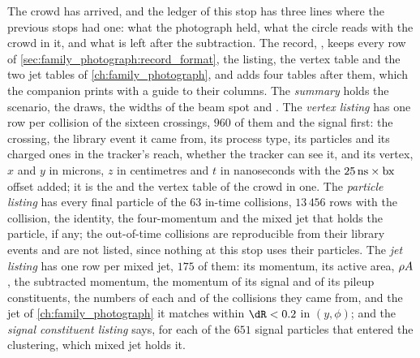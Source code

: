 The crowd has arrived, and the ledger of this stop has three lines where
the previous stops had one: what the photograph held, what the circle
reads with the crowd in it, and what is left after the subtraction.
\label{sec:crowd_on_the_road:record_format}
The record, , keeps every row of
\cref{sec:family_photograph:record_format}, the listing, the vertex table
and the two jet tables of \cref{ch:family_photograph}, and adds four
tables after them, which the companion prints with a guide to their
columns. The \emph{summary} holds the scenario, the draws, the widths of
the beam spot and \rhoPU. The \emph{vertex listing} has one row per
collision of the sixteen crossings, $960$ of them and the signal first:
the crossing, the library event it came from, its process type, its
particles and its charged ones in the tracker's reach, whether the
tracker can see it, and its vertex, $x$ and $y$ in microns, $z$ in
centimetres and $t$ in nanoseconds with the $25\,\mathrm{ns}\times\mathrm{bx}$ offset
added; it is the  and the vertex table of the
crowd in one. The \emph{particle listing} has every final particle of the
$63$ in-time collisions, $13\,456$ rows with the collision, the identity,
the four-momentum and the mixed jet that holds the particle, if any; the
out-of-time collisions are reproducible from their library events and are
not listed, since nothing at this stop uses their particles. The
\emph{jet listing} has one row per mixed \antikt jet, $175$ of them: its
momentum, its active area, $\rho A$, the subtracted momentum, the
momentum of its signal and of its pileup constituents, the numbers of
each and of the collisions they came from, and the jet of
\cref{ch:family_photograph} it matches within $\dR<0.2$ in $(y,\phi)$; and the
\emph{signal constituent listing} says, for each of the $651$ signal
particles that entered the clustering, which mixed jet holds it.

